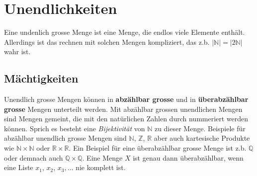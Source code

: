 \documentclass{article}
\begin{document}
\section{Unendlichkeiten}
Eine undenlich grosse Menge ist eine Menge, die endlos viele Elemente enthält. Allerdings ist das rechnen mit solchen Mengen kompliziert, das z.b. \(| \mathbb{N}| = |2 \mathbb{N}|\) wahr ist.
\subsection{Mächtigkeiten}
Unendlich grosse Mengen können in \textbf{abzählbar grosse} und in \textbf{überabzählbar grosse} Mengen unterteilt werden. Mit abzählbar grossen unendlichen Mengen sind Mengen gemeint, die mit den natürlichen Zahlen durch nummeriert werden können. Sprich es besteht eine \textit{Bijektivität} von \( \mathbb{N}\) zu dieser Menge. Beispiele für abzählbar unendlich grosse Mengen sind \( \mathbb{N}\), \( \mathbb{Z}\), \( \mathbb{R}\) aber auch kartesische Produkte wie \( \mathbb{N}\times \mathbb{N}\) oder \( \mathbb{R}\times \mathbb{R}\). Ein Beispiel für eine überabzählbar grosse Menge ist z.b. \( \mathbb{Q}\) oder demnach auch \( \mathbb{Q}\times \mathbb{Q}\). Eine Menge \(X\) ist genau dann überabzählbar, wenn eine Liste \(x_1\), \( x_2\), \(x_3, ...\) nie komplett ist.

\newpage
\end{document}
